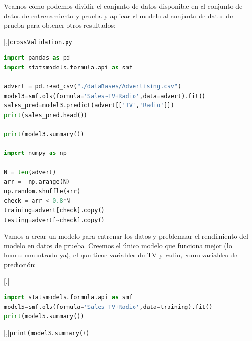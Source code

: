 Veamos cómo podemos dividir el conjunto de datos disponible en el conjunto de datos de entrenamiento y prueba
y aplicar el modelo al conjunto de datos de prueba para obtener otros resultados:

[,]{\texttt{crossValidation.py}}
\begin{lstlisting}[language=Python]
import pandas as pd
import statsmodels.formula.api as smf

advert = pd.read_csv("./dataBases/Advertising.csv")
model3=smf.ols(formula='Sales~TV+Radio',data=advert).fit()
sales_pred=model3.predict(advert[['TV','Radio']])
print(sales_pred.head())

print(model3.summary())

import numpy as np

N = len(advert)
arr =  np.arange(N)
np.random.shuffle(arr)
check = arr < 0.8*N
training=advert[check].copy()
testing=advert[~check].copy()
\end{lstlisting}


Vamos a crear un modelo para entrenar los datos y problemaar el rendimiento del modelo en
datos de prueba. Creemos el único modelo que funciona mejor (lo hemos encontrado ya),
el que tiene variables de TV y radio, como variables de predicción:

[,]{}
\begin{lstlisting}[language=Python]
import statsmodels.formula.api as smf
model5=smf.ols(formula='Sales~TV+Radio',data=training).fit()
print(model5.summary())
\end{lstlisting}

[,]{\texttt{print(model3.summary())}}

